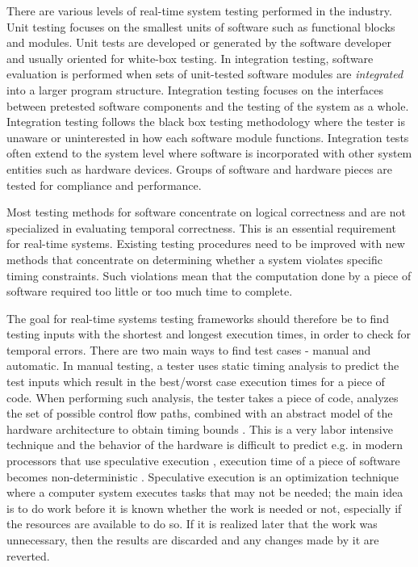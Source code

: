 There are various levels of real-time system testing performed in the industry.
Unit testing focuses on the smallest units of software such as functional blocks
and modules. Unit tests are developed or generated by the software developer and
usually oriented for white-box testing. In integration testing, software
evaluation is performed when sets of unit-tested software modules are
\emph{integrated} into a larger program structure. Integration testing focuses
on the interfaces between pretested software components and the testing of the
system as a whole. Integration testing follows the black box testing methodology
where the tester is unaware or uninterested in how each software module
functions. Integration tests often extend to the system level where software is
incorporated with other system entities such as hardware devices. Groups of
software and hardware pieces are tested for compliance and performance.

Most testing methods for software concentrate on logical correctness and are not
specialized in evaluating temporal correctness. This is an essential requirement
for real-time systems. Existing testing procedures need to be improved with new
methods that concentrate on determining whether a system violates specific
timing constraints. Such violations mean that the computation done by a piece of
software required too little or too much time to complete.

The goal for real-time systems testing frameworks should therefore be to find
testing inputs with the shortest and longest execution times, in order to check
for temporal errors. There are two main ways to find test cases - manual and
automatic. In manual testing, a tester uses static timing analysis to predict
the test inputs which result in the best/worst case execution times for a piece
of code. When performing such analysis, the tester takes a piece of code,
analyzes the set of possible control flow paths, combined with an abstract model
of the hardware architecture to obtain timing bounds \cite{reviewWCET}. This is
a very labor intensive technique and the behavior of the hardware is difficult
to predict e.g. in modern processors that use speculative execution
\cite{hennessy2011computer}, execution time of a piece of software becomes
non-deterministic \cite{reineke2006definition}. Speculative execution is an
optimization technique where a computer system executes tasks that may not be
needed; the main idea is to do work before it is known whether the work is
needed or not, especially if the resources are available to do so. If it is
realized later that the work was unnecessary, then the results are discarded and
any changes made by it are reverted.

